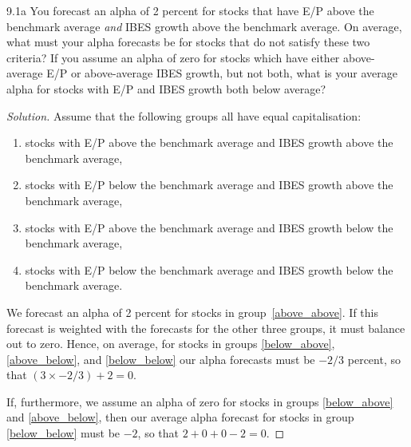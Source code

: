 \begin{problem}{9.1a}
You forecast an alpha of 2 percent for stocks that have E/P above the benchmark average \emph{and} IBES growth above the benchmark average. On average, what must your alpha forecasts be for stocks that do not satisfy these two criteria? If you assume an alpha of zero for stocks which have either above-average E/P or above-average IBES growth, but not both, what is your average alpha for stocks with E/P and IBES growth both below average?
\end{problem}

\begin{proof}[Solution]
Assume that the following groups all have equal capitalisation:
\begin{enumerate}
\item stocks with E/P above the benchmark average and IBES growth above the benchmark average,\label{above_above}
\item stocks with E/P below the benchmark average and IBES growth above the benchmark average,\label{below_above}
\item stocks with E/P above the benchmark average and IBES growth below the benchmark average,\label{above_below}
\item stocks with E/P below the benchmark average and IBES growth below the benchmark average.\label{below_below}
\end{enumerate}
We forecast an alpha of 2 percent for stocks in group~\ref{above_above}. If this forecast is weighted with the forecasts for the other three groups, it must balance out to zero. Hence, on average, for stocks in groups \ref{below_above}, \ref{above_below}, and \ref{below_below} our alpha forecasts must be $-2/3$ percent, so that $(3 \times -2/3) + 2 = 0$.

If, furthermore, we assume an alpha of zero for stocks in groups \ref{below_above} and \ref{above_below}, then our average alpha forecast for stocks in group \ref{below_below} must be $-2$, so that $2 + 0 + 0 - 2 = 0$. 
\end{proof}